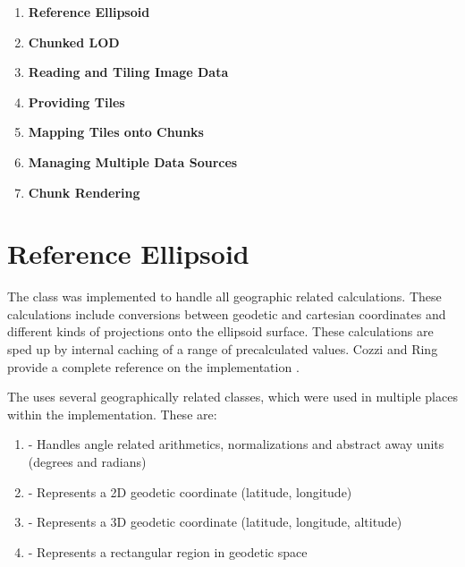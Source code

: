\begin{enumerate}
	\item \textbf{Reference Ellipsoid}%
	\item \textbf{Chunked LOD}%
	\item \textbf{Reading and Tiling Image Data}%
	\item \textbf{Providing Tiles}%
	\item \textbf{Mapping Tiles onto Chunks}%
	\item \textbf{Managing Multiple Data Sources}%
	\item \textbf{Chunk Rendering}%
\end{enumerate}



\section{Reference Ellipsoid}
The  class was implemented to handle all geographic related calculations.  These calculations include conversions between geodetic and cartesian coordinates and different kinds of projections onto the ellipsoid surface. These calculations are sped up by internal caching of a range of precalculated values. Cozzi and Ring provide a complete reference on the implementation \cite[p. 17]{cozzi11}.

The  uses several geographically related classes, which were used in multiple places within the implementation. These are:
\begin{enumerate}
	\item {} - Handles angle related arithmetics, normalizations and abstract away units (degrees and radians)
	\item {} - Represents a 2D geodetic coordinate (latitude, longitude)
	\item {} - Represents a 3D geodetic coordinate (latitude, longitude, altitude)
	\item {} - Represents a rectangular region in geodetic space
\end{enumerate}

